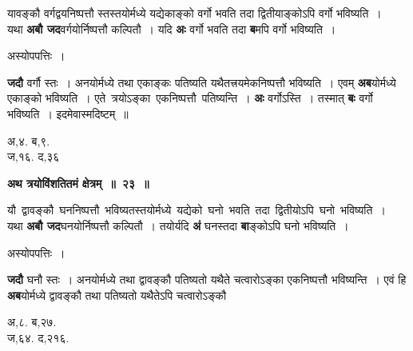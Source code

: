 \documentclass[11pt, openany]{book}
\begin{document}
{\ab यावङ्कौ वर्गद्वयनिष्पत्तौ स्तस्तयोर्मध्ये यद्येकाङ्को वर्गो 
भवति तदा द्वितीयाङ्कोऽपि वर्गो भविष्यति~। }\\

 यथा \textbf{अबौ जद}वर्गयोर्निष्पत्तौ कल्पितौ~। यदि \textbf{अः} वर्गो भवति तदा \textbf{ब}मपि वर्गो भविष्यति~। 

\begin{center}
अस्योपपत्तिः~।
\end{center}

\begin{flushleft}
\begin{minipage}[t]{0.75\textwidth}
\hspace{4mm} \textbf{जदौ} वर्गौ स्तः~। अनयोर्मध्ये तथा एकाङ्कः पतिष्यति यथैतत्त्रयमेकनिष्पत्तौ भविष्यति~। एवम् \textbf{अब}योर्मध्ये एकाङ्को भविष्यति~। एते \,त्रयोऽङ्का \,एकनिष्पत्तौ \,पतिष्यन्ति~। \textbf{अः} वर्गोऽस्ति~। तस्मात् \textbf{बः} वर्गो भविष्यति~। इदमेवास्मदिष्टम्~॥
\end{minipage} 
\hfill
\begin{minipage}[t]{0.15\textwidth}
अ,४. ब,९.\\
ज,१६. द,३६
\end{minipage}
\end{flushleft}

\newpage
\begin{center}
\textbf{\large अथ त्रयोविंशतितमं क्षेत्रम्~॥~२३~॥}
\end{center}

 {\ab यौ \,द्वावङ्कौ \,घननिष्पत्तौ \,भविष्यतस्तयोर्मध्ये \,यद्येको \,घनो \,भवति \,तदा \,द्वितीयोऽपि \,घनो \,भविष्यति~। }\\

 यथा \textbf{अबौ जद}घनयोर्निष्पत्तौ कल्पितौ~। तयोर्यदि \textbf{अं} घनस्तदा \textbf{बा}ङ्कोऽपि घनो भविष्यति~।

\begin{center}
अस्योपपत्तिः~। 
\end{center}

\begin{flushleft}
\begin{minipage}[t]{0.65\textwidth}
\hspace{4mm}  \textbf{जदौ} घनौ स्तः~। अनयोर्मध्ये तथा द्वावङ्कौ पतिष्यतो यथैते चत्वारोऽङ्का एकनिष्पत्तौ भविष्यन्ति~। एवं हि \textbf{अब}योर्मध्ये द्वावङ्कौ तथा पतिष्यतो यथैतेऽपि चत्वारोऽङ्कौ 
\end{minipage} 
\hfill
\begin{minipage}[t]{0.25\textwidth}
अ,८. ब,२७.\\
ज,६४. द,२१६.
\end{minipage}
\end{flushleft}
\vspace{-3mm}
\end{document}
